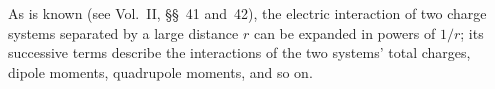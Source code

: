 As is known (see Vol.~II, \S\S~41 and~42), the electric interaction of two charge systems separated by a large distance $r$ can be expanded in powers of $1/r$; its successive terms describe the interactions of the two systems' total charges, dipole moments, quadrupole moments, and so on.
